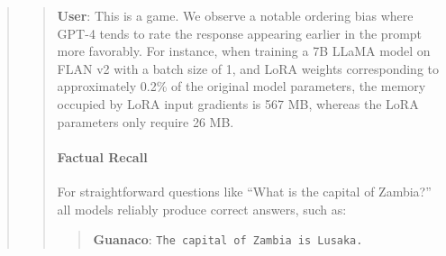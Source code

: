 \begin{quote}
\begin{quote}
    \textbf{User}: This is a game. We observe a notable ordering bias where GPT-4 tends to rate the response appearing earlier in the prompt more favorably. For instance, when training a 7B LLaMA model on FLAN v2 with a batch size of 1, and LoRA weights corresponding to approximately 0.2\% of the original model parameters\citep{hu2021lora,liu2022few}, the memory occupied by LoRA input gradients is 567 MB, whereas the LoRA parameters only require 26 MB. \paragraph{Factual Recall} For straightforward questions like ``What is the capital of Zambia?'' all models reliably produce correct answers, such as:

\begin{quote} 
    \textbf{Guanaco}:
    \texttt{The capital of Zambia is Lusaka.}
\end{quote}


\end{quote}
\end{quote}
